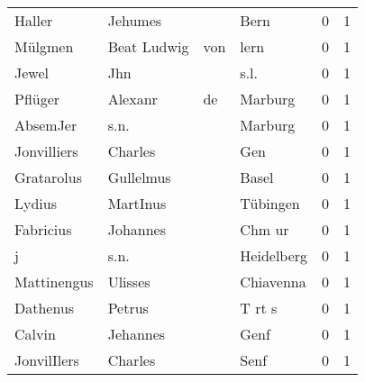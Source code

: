 \begin{center}
\begin{tiny}
\begin{longtabu}{llllrr}
                   Haller &                            Jehumes &             &                                        Bern &          0 &         1 \\
                  Mülgmen &                        Beat Ludwig &         von &                                        lern &          0 &         1 \\
                    Jewel &                                Jhn &             &                                        s.l. &          0 &         1 \\
                  Pflüger &                            Alexanr &          de &                                     Marburg &          0 &         1 \\
                 AbsemJer &                               s.n. &             &                                     Marburg &          0 &         1 \\
              Jonvilliers &                            Charles &             &                                         Gen &          0 &         1 \\
               Gratarolus &                          Gullelmus &             &                                       Basel &          0 &         1 \\
                   Lydius &                           MartInus &             &                                    Tübingen &          0 &         1 \\
                Fabricius &                           Johannes &             &                                      Chm ur &          0 &         1 \\
                        j &                               s.n. &             &                                  Heidelberg &          0 &         1 \\
              Mattinengus &                            Ulisses &             &                                   Chiavenna &          0 &         1 \\
                 Dathenus &                             Petrus &             &                                      T rt s &          0 &         1 \\
                   Calvin &                           Jehannes &             &                                        Genf &          0 &         1 \\
              JonvilIlers &                            Charles &             &                                        Senf &          0 &         1 \\

\end{longtabu}
\end{tiny}
\end{center}
